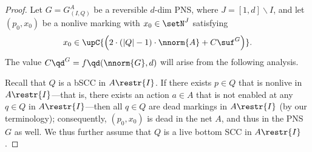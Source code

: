 \begin{proof}
	Let $G=G^A_{(I,Q)}$ be a reversible $d$-dim PNS, where
	$J=[1,d]\smallsetminus I$, and let $(p_0,x_0)$
be a nonlive marking with $x_0\in\setN^J$ satisfying	
	\begin{equation}\label{eq:xzerobegin}
		x_0\in\upC{\left(2\cdot(|Q|-1)\cdot\nnorm{A}+C\suf^G\right)}.
	\end{equation}
	The value $C\qd^G=f\qd(\nnorm{G},d)$ will arise from the
	following analysis.

Recall that $Q$ is a
	bSCC in $A\restr{I}$.
If there exists $p\in Q$ that is nonlive in $A\restr{I}$---that is, there exists an action
	$a\in A$ that is not enabled at any $q\in Q$ in
	$A\restr{I}$---then all $q\in Q$ are dead markings in
	$A\restr{I}$ (by our terminology);
consequently, $(p_0,x_0)$ is dead in the net $A$, and thus in the PNS $G$ as well.
	We thus further assume that $Q$ is a live bottom SCC in
	$A\restr{I}$.


\end{proof}

